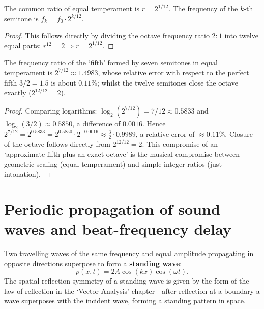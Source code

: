 \begin{theorem}\label{thm:equal_temperament}
The common ratio of equal temperament is $r = 2^{1/12}$. The frequency of the $k$-th semitone is $f_k = f_0 \cdot 2^{k/12}$.
\end{theorem}

\begin{proof}
This follows directly by dividing the octave frequency ratio $2:1$ into twelve equal parts: $r^{12} = 2 \Rightarrow r = 2^{1/12}$.
\end{proof}

\begin{lemma}\label{ch22_fifth_approximation}
The frequency ratio of the `fifth' formed by seven semitones in equal temperament is $2^{7/12} \approx 1.4983$, whose relative error with respect to the perfect fifth $3/2 = 1.5$ is about $0.11\%$; whilst the twelve semitones close the octave exactly ($2^{12/12} = 2$).
\end{lemma}

\begin{proof}
Comparing logarithms: $\log_2(2^{7/12}) = 7/12 \approx 0.5833$ and $\log_2(3/2) \approx 0.5850$, a difference of $0.0016$. Hence $2^{7/12} = 2^{0.5833} = 2^{0.5850} \cdot 2^{-0.0016} \approx \frac{3}{2} \cdot 0.9989$, a relative error of $\approx 0.11\%$. Closure of the octave follows directly from $2^{12/12}=2$. This compromise of an `approximate fifth plus an exact octave' is the musical compromise between geometric scaling (equal temperament) and simple integer ratios (just intonation).
\end{proof}

\section{Periodic propagation of sound waves and beat-frequency delay}

\begin{definition}\label{def:standing_wave}
Two travelling waves of the same frequency and equal amplitude propagating in opposite directions superpose to form a \textbf{standing wave}:
\[
p(x, t) = 2A\cos(kx)\cos(\omega t).
\]
The spatial reflection symmetry of a standing wave is given by the form of the law of reflection in the `Vector Analysis' chapter---after reflection at a boundary a wave superposes with the incident wave, forming a standing pattern in space.
\end{definition}

